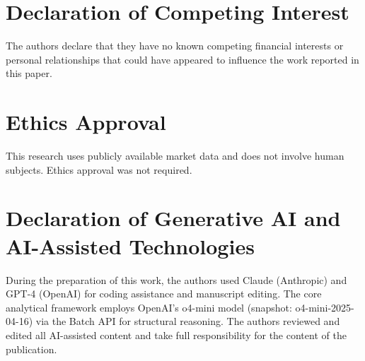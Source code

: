 \documentclass[preprint,12pt,authoryear]{elsarticle}
\begin{document}



\FloatBarrier


\FloatBarrier




\section*{Declaration of Competing Interest}
The authors declare that they have no known competing financial interests or personal relationships that could have appeared to influence the work reported in this paper.

\section*{Ethics Approval}
This research uses publicly available market data and does not involve human subjects. Ethics approval was not required.

\section*{Declaration of Generative AI and AI-Assisted Technologies}
During the preparation of this work, the authors used Claude (Anthropic) and GPT-4 (OpenAI) for coding assistance and manuscript editing. The core analytical framework employs OpenAI's o4-mini model (snapshot: o4-mini-2025-04-16) via the Batch API for structural reasoning. The authors reviewed and edited all AI-assisted content and take full responsibility for the content of the publication.
\end{document}

